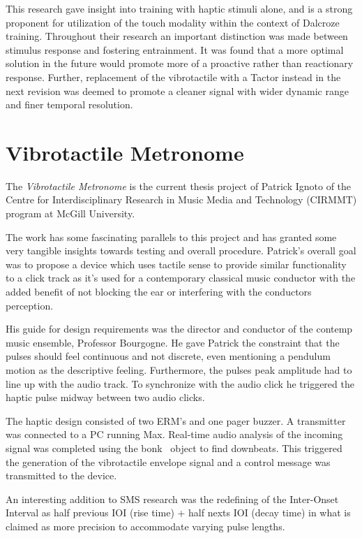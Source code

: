 This research gave insight into training with haptic stimuli alone, and is a strong proponent for utilization of the touch modality within the context of Dalcroze training. Throughout their research an important distinction was made between stimulus response and fostering entrainment. It was found that a more optimal solution in the future would promote more of a proactive rather than reactionary response. Further, replacement of the vibrotactile with a Tactor instead in the next revision was deemed to promote a cleaner signal with wider dynamic range and finer temporal resolution.

\section{Vibrotactile Metronome} \label{vibrotactileMetronome}
The \textit{Vibrotactile Metronome} is the current thesis project of Patrick Ignoto of the Centre for Interdisciplinary Research in Music Media and Technology (CIRMMT) program at McGill University.

The work has some fascinating parallels to this project and has granted some very tangible insights towards testing and overall procedure. Patrick’s overall goal was to propose a device which uses tactile sense to provide similar functionality to a click track as it’s used for a contemporary classical music conductor with the added benefit of not blocking the ear or interfering with the conductors perception. \cite{ignoto2017development}

His guide for design requirements was the director and conductor of the contemp music ensemble, Professor Bourgogne. He gave Patrick the constraint that the pulses should feel continuous and not discrete, even mentioning a pendulum motion as the descriptive feeling. Furthermore, the pulses peak amplitude had to line up with the audio track. To synchronize with the audio click he triggered the haptic pulse midway between two audio clicks.

The haptic design consisted of two ERM’s and one pager buzzer. A transmitter was connected to a PC running Max. Real-time audio analysis of the incoming signal was completed using the bonk~ object to find downbeats. This triggered the generation of the vibrotactile envelope signal and a control message was transmitted to the device.

An interesting addition to SMS research was the redefining of the Inter-Onset Interval as half previous IOI (rise time) + half nexts IOI (decay time) in what is claimed as more precision to accommodate varying pulse lengths.

